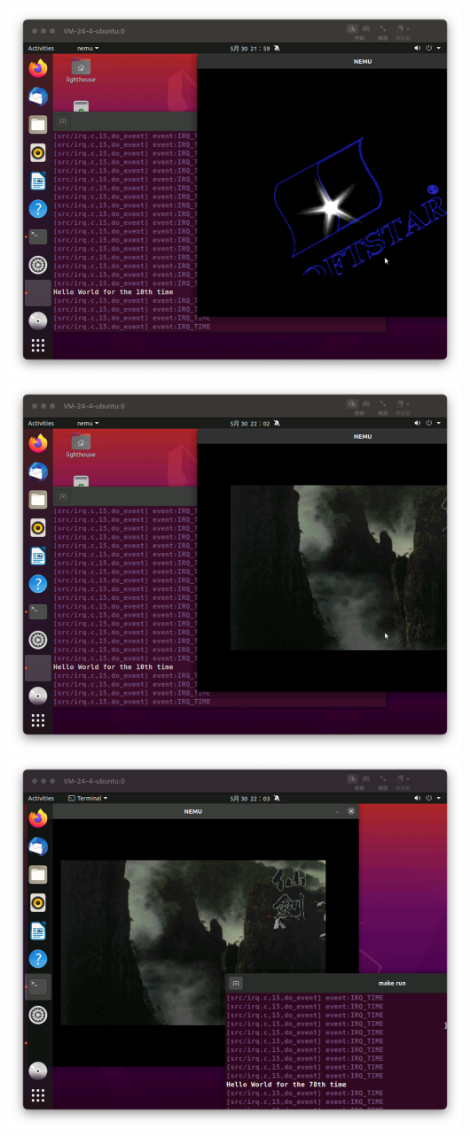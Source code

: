 \documentclass[UTF8,a4paper,10pt]{ctexart}
\begin{document}
\begin{center}
\includegraphics[width=0.9\textwidth]{img/13.png}
\includegraphics[width=0.9\textwidth]{img/14.png}
\includegraphics[width=0.9\textwidth]{img/15.png}
\end{center}
\end{document}
